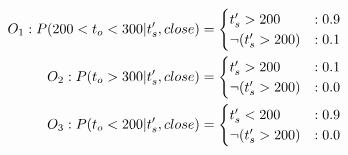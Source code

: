 \documentclass{article}
\begin{document}
\begin{align*}
O_1:P(200<t_o<300 |t_s',close) = 
\begin{cases}
  t_s'>200 &: 0.9 \\
\neg(t_s'>200) &: 0.1 \\
 \end{cases}
 \\
 \hspace{-4mm} 
O_2:P(t_o>300|t_s',close) = 
\begin{cases}
 t_s'>200 &: 0.1 \\
 \neg(t_s'>200) &: 0.0 \\
 \end{cases}
\\
\hspace{-4mm} 
O_3:P(t_o<200|t_s',close) = 
\begin{cases}
 t_s'<200 &: 0.9 \\
 \neg(t_s'>200) &: 0.0 \\
\end{cases}
\end{align*}
%
\end{document}

